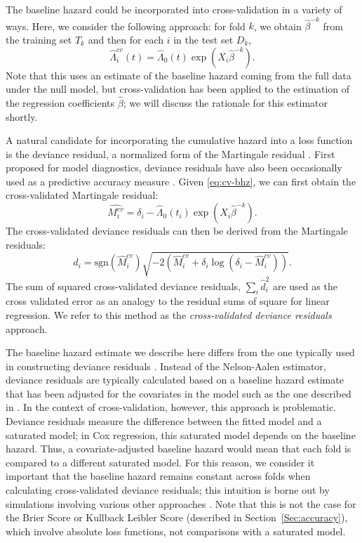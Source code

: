 The baseline hazard could be incorporated into cross-validation in a variety of ways.  Here, we consider the following approach: for fold $k$, we obtain $\hat{\beta}^{-k}$ from the training set $T_k$ and then for each $i$ in the test set $D_k$, 
\begin{equation}
 \label{eq:cv-bhz}
  \hat{\Lambda}^{cv}_{i}(t) =  \hat{\Lambda}_{0}(t)\exp(X_i\hat\beta^{-k}).
\end{equation}
Note that this uses an estimate of the baseline hazard coming from the full data under the null model, but cross-validation has been applied to the estimation of the regression coefficients $\hat{\beta}$; we will discuss the rationale for this estimator shortly.

A natural candidate for incorporating the cumulative hazard into a loss function is the deviance residual, a normalized form of the Martingale residual \citep{Therneau1990}. First proposed for model diagnostics, deviance residuals have also been occasionally used as a predictive accuracy measure \citep{Therneau2018}.  Given \eqref{eq:cv-bhz}, we can first obtain the cross-validated Martingale residual: 
\begin{equation}
  \hat{M^{cv}_{i}} = \delta_{i} - \hat{\Lambda}_{0}(t_{i})\exp(X_i\hat\beta^{-k}).
\end{equation}
The cross-validated deviance residuals can then be derived from the Martingale residuals: 
\begin{equation} 
  d_{i} = \text{sgn}(\hat{M}^{cv}_{i})\sqrt{-2(\hat{M}^{cv}_{i} + \delta_{i}\log(\delta_{i} - \hat{M}^{cv}_{i}))}.
\end{equation}
The sum of squared cross-validated deviance residuals, $\sum_{i}\hat{d}_{i}^2$ are used as the cross validated error as an analogy to the residual sums of square for linear regression. We refer to this method as the \emph{cross-validated deviance residuals} approach.

The baseline hazard estimate we describe here differs from the one typically used in constructing deviance residuals \citep{Therneau1990}. Instead of the Nelson-Aalen estimator, deviance residuals are typically calculated based on a baseline hazard estimate that has been adjusted for the covariates in the model such as the one described in \citet{breslow1972}. In the context of cross-validation, however, this approach is problematic. Deviance residuals measure the difference between the fitted model and a saturated model; in Cox regression, this saturated model depends on the baseline hazard. Thus, a covariate-adjusted baseline hazard would mean that each fold is compared to a different saturated model. For this reason, we consider it important that the baseline hazard remains constant across folds when calculating cross-validated deviance residuals; this intuition is borne out by simulations involving various other approaches .  Note that this is not the case for the Brier Score or Kullback Leibler Score (described in Section~\ref{Sec:accuracy}), which involve absolute loss functions, not comparisons with a saturated model.

